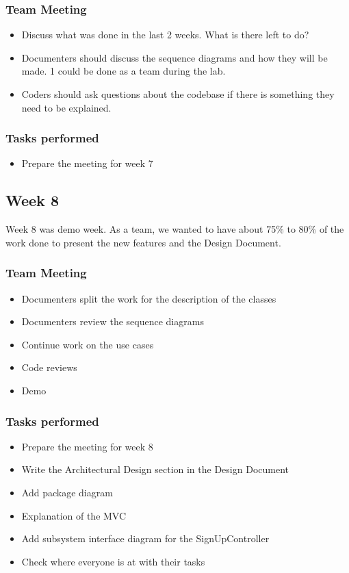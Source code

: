 \documentclass[12pt]{article}
\begin{document}
\subsubsection{Team Meeting}
\begin{itemize}
    \item Discuss what was done in the last 2 weeks. What is there left to do?
    \item Documenters should discuss the sequence diagrams and how they will be made. 1 could be done as a team during the lab.
    \item Coders should ask questions about the codebase if there is something they need to be explained.
\end{itemize}

\subsubsection{Tasks performed}
\begin{itemize}
    \item Prepare the meeting for week 7
\end{itemize}

\subsection{Week 8}
Week 8 was demo week. As a team, we wanted to have about 75\% to 80\% of the work done to present the new features and the Design Document.

\subsubsection{Team Meeting}
\begin{itemize}
    \item Documenters split the work for the description of the classes
    \item Documenters review the sequence diagrams
    \item Continue work on the use cases
    \item Code reviews
    \item Demo
\end{itemize}

\subsubsection{Tasks performed}
\begin{itemize}
    \item Prepare the meeting for week 8
    \item Write the Architectural Design section in the Design Document
    \item Add package diagram
    \item Explanation of the MVC
    \item Add subsystem interface diagram for the SignUpController
    \item Check where everyone is at with their tasks
\end{itemize}
\end{document}
